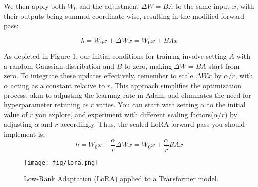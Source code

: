\documentclass[11pt,addpoints,answers]{exam}
\begin{document}
\begin{questions}
We then apply both \(W_0\) and the adjustment \(\Delta W = BA\) to the same input \(x\), with their outputs being summed coordinate-wise, resulting in the modified forward pass:

\[
h = W_0x + \Delta Wx = W_0x + BAx
\]

As depicted in Figure 1, our initial conditions for training involve setting \(A\) with a random Gaussian distribution and \(B\) to zero, making \(\Delta W = BA\) start from zero. To integrate these updates effectively, remember to scale \(\Delta W x\) by \(\alpha/ r\), with \(\alpha\) acting as a constant relative to \(r\). This approach simplifies the optimization process, akin to adjusting the learning rate in Adam, and eliminates the need for hyperparameter retuning as \(r\) varies. You can start with setting \(\alpha\) to the initial value of \(r\) you explore, and experiment with different scaling factors(\(\alpha/ r\)) by adjusting  \(\alpha\) and \(r\) accordingly. Thus, the scaled LoRA forward pass you should implement is:
\[
h = W_0x + \frac{\alpha}{r} \Delta Wx  = W_0x + \frac{\alpha}{r} BAx 
\]


\begin{figure}[h]
\centering
\texttt{[image: fig/lora.png]}
\caption{Low-Rank Adaptation (LoRA) applied to a Transformer model.}
\label{fig:lora}
\end{figure}



\end{questions}
\end{document}
